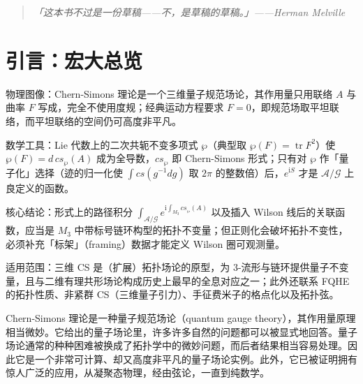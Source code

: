 

\begin{quote}
  \itshape 「这本书不过是一份草稿——不，是草稿的草稿。」——Herman Melville
\end{quote}

\section{引言：宏大总览} %

\begin{keytakeaways}
  \item 物理图像：Chern-Simons 理论是一个三维量子规范场论，其作用量只用联络 $A$ 与曲率 $F$ 写成，完全不使用度规；经典运动方程要求 $F=0$，即规范场取平坦联络，而平坦联络的空间仍可高度非平凡。
  \item 数学工具：Lie 代数上的二次共轭不变多项式 $\wp$（典型取 $\wp(F)=\operatorname{tr}F^2$）使 $\wp(F)=d\,cs_\wp(A)$ 成为全导数，$cs_\wp$ 即 Chern-Simons 形式；只有对 $\wp$ 作「量子化」选择（迹的归一化使 $\int cs(g^{-1}dg)$ 取 $2\pi$ 的整数倍）后，$e^{\mathrm{i}S}$ 才是 $\mathcal{A}/\mathcal{G}$ 上良定义的函数。
  \item 核心结论：形式上的路径积分 $\int_{\mathcal{A}/\mathcal{G}}e^{\mathrm{i}\int_{M_3}cs_\wp(A)}$ 以及插入 Wilson 线后的关联函数，应当是 $M_3$ 中带标号链环构型的拓扑不变量；但正则化会破坏拓扑不变性，必须补充「标架」（framing）数据才能定义 Wilson 圈可观测量。
  \item 适用范围：三维 CS 是（扩展）拓扑场论的原型，为 3-流形与链环提供量子不变量，且与二维有理共形场论构成历史上最早的全息对应之一；此外还联系 FQHE 的拓扑性质、非紧群 CS（三维量子引力）、手征费米子的格点化以及拓扑弦。
\end{keytakeaways}

Chern-Simons 理论是一种量子规范场论（quantum gauge theory），其作用量原理相当微妙。它给出的量子场论里，许多许多自然的问题都可以被显式地回答。量子场论通常的种种困难被换成了拓扑学中的微妙问题，而后者结果相当容易处理。因此它是一个非常可计算、却又高度非平凡的量子场论实例。此外，它已被证明拥有惊人广泛的应用，从凝聚态物理，经由弦论，一直到纯数学。

